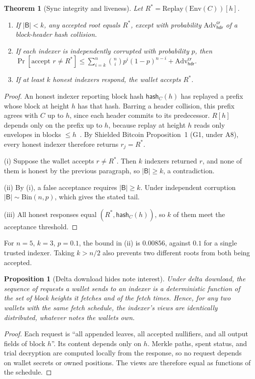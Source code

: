 \documentclass[11pt]{article}
\newtheorem{theorem}{Theorem}
\newtheorem{proposition}{Proposition}
\theoremstyle{remark}
\newcommand{\SB}{Shielded Bitcoin}
\begin{document}
\begin{theorem}[Sync integrity and liveness]
\label{prop:sync}
Let $R^\ast = \mathrm{Replay}(\mathrm{Env}(C))[h]$.
\begin{enumerate}
  \item[(i)] If $|\mathsf{B}| < k$, any accepted root equals $R^\ast$, except with probability $\mathrm{Adv}^{\mathsf{cr}}_{\mathsf{hdr}}$ of a block-header hash collision.
  \item[(ii)] If each indexer is independently corrupted with probability $p$, then $\Pr[\text{accept } r \ne R^\ast] \le \sum_{i=k}^{n} \binom{n}{i} p^i (1-p)^{n-i} + \mathrm{Adv}^{\mathsf{cr}}_{\mathsf{hdr}}$.
  \item[(iii)] If at least $k$ honest indexers respond, the wallet accepts $R^\ast$.
\end{enumerate}
\end{theorem}
\begin{proof}
An honest indexer reporting block hash $\mathsf{hash}_C(h)$ has replayed a prefix whose block at height $h$ has that hash. Barring a header collision, this prefix agrees with $C$ up to $h$, since each header commits to its predecessor. $R[h]$ depends only on the prefix up to $h$, because replay at height $h$ reads only envelopes in blocks $\le h$~\cite[§8]{sb26}. By \SB{} Proposition~1 (G1, under A8), every honest indexer therefore returns $r_j = R^\ast$.

(i) Suppose the wallet accepts $r \ne R^\ast$. Then $k$ indexers returned $r$, and none of them is honest by the previous paragraph, so $|\mathsf{B}| \ge k$, a contradiction.

(ii) By (i), a false acceptance requires $|\mathsf{B}| \ge k$. Under independent corruption $|\mathsf{B}| \sim \mathrm{Bin}(n,p)$, which gives the stated tail.

(iii) All honest responses equal $(R^\ast, \mathsf{hash}_C(h))$, so $k$ of them meet the acceptance threshold.
\end{proof}
For $n = 5$, $k = 3$, $p = 0.1$, the bound in (ii) is $0.00856$, against $0.1$ for a single trusted indexer. Taking $k > n/2$ also prevents two different roots from both being accepted.

\begin{proposition}[Delta download hides note interest]
\label{prop:delta}
Under delta download, the sequence of requests a wallet sends to an indexer is a deterministic function of the set of block heights it fetches and of the fetch times. Hence, for any two wallets with the same fetch schedule, the indexer's views are identically distributed, whatever notes the wallets own.
\end{proposition}
\begin{proof}
Each request is ``all appended leaves, all accepted nullifiers, and all output fields of block $h$''. Its content depends only on $h$. Merkle paths, spent status, and trial decryption are computed locally from the response, so no request depends on wallet secrets or owned positions. The views are therefore equal as functions of the schedule.
\end{proof}
\end{document}
